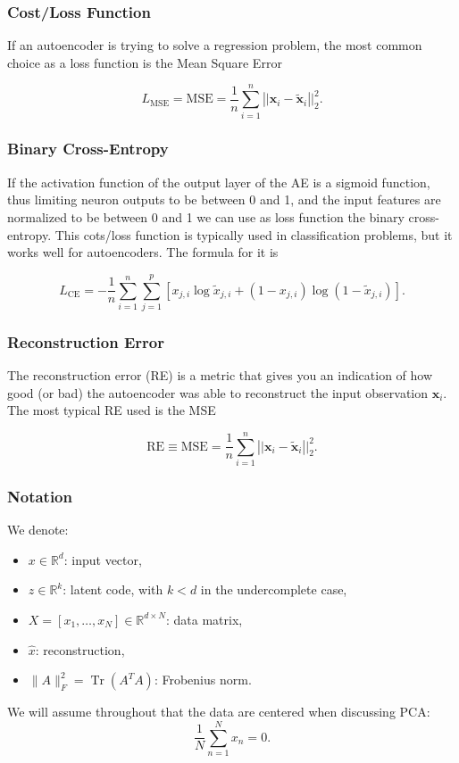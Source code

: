 \documentclass{beamer}
\begin{document}
\begin{frame}
\frametitle{Cost/Loss Function}

If an autoencoder is trying to solve a regression problem, the most
common choice as a loss function is the Mean Square Error

\[
L_{\textrm{MSE}} = \textrm{MSE} = \frac{1}{n}\sum_{i = 1}^{n}\left\vert\vert\mathbf{x}_{i}-\tilde{\mathbf{x}}_{i}\right\vert\vert^{2}_2.
\]
\end{frame}

\begin{frame}
\frametitle{Binary Cross-Entropy}

If the activation function of the output layer of the AE is a sigmoid
function, thus limiting neuron outputs to be between 0 and 1, and the
input features are normalized to be between 0 and 1 we can use as loss
function the binary cross-entropy. This cots/loss function is
typically used in classification problems, but it works well for
autoencoders. The formula for it is

\[
L_{\textrm{CE}} = -\frac{1}{n}\sum_{i = 1}^{n}\sum_{j = 1}^{p}[x_{j,i} \log\tilde{x}_{j,i}+\left(1-x_{j,i}\right)\log (1-\tilde{x}_{j,i})].
\]
\end{frame}

\begin{frame}
\frametitle{Reconstruction Error}

The reconstruction error (RE) is a metric that gives you an indication of how good (or bad) the autoencoder was able to reconstruct
the input observation $\mathbf{x}_{i}$. The most typical RE used is the MSE

\[
\textrm{RE}\equiv \textrm{MSE} = \frac{1}{n}\sum_{i = 1}^{n}\left\vert\vert\mathbf{x}_{i}-\tilde{\mathbf{x}}_{i}\right\vert\vert^{2}_2.
\]
\end{frame}

\begin{frame}
\frametitle{Notation}

We denote:
\begin{itemize}
\item \(x \in \mathbb{R}^d\): input vector,

\item \(z \in \mathbb{R}^k\): latent code, with \(k<d\) in the undercomplete case,

\item \(X=[x_1,\dots,x_N]\in \mathbb{R}^{d\times N}\): data matrix,

\item \(\hat x\): reconstruction,

\item \(\|A\|_F^2 = \operatorname{Tr}(A^T A)\): Frobenius norm.
\end{itemize}

\noindent
We will assume throughout that the data are centered when discussing PCA:
\[
\frac{1}{N}\sum_{n=1}^N x_n = 0.
\]
\end{frame}
\end{document}
